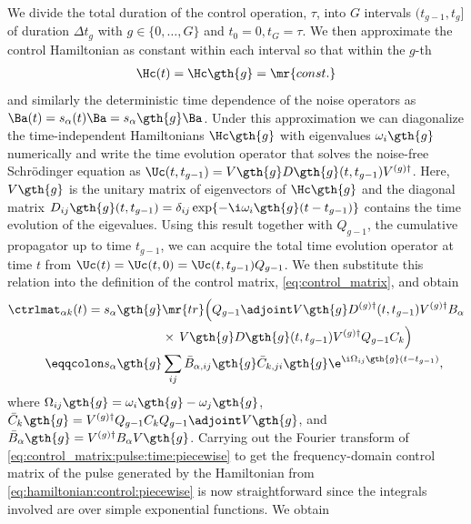 We divide the total duration of the control operation, $\tau$, into $G$ intervals $(t_{g-1}, t_{g}]$ of duration $\Delta t_g$ with $g\in\lbrace 0,\dotsc,G\rbrace$ and $t_0 =  0, t_G = \tau$. We then approximate the control Hamiltonian as constant within each interval so that within the $g$-th
\begin{align}\label{eq:hamiltonian:control:piecewise}
    \Hc(t) = \Hc\gth{g} = \mr{const.}
\end{align}
and similarly the deterministic time dependence of the noise operators as $\Ba(t) = s_\alpha(t)\Ba = s_\alpha\gth{g}\Ba$. Under this approximation we can diagonalize the time-independent Hamiltonians $\Hc\gth{g}$ with eigenvalues $\omega_i\gth{g}$ numerically and write the time evolution operator that solves the noise-free Schr\"odinger equation as $\Uc(t, t_{g-1}) = V\gth{g}D\gth{g}(t, t_{g-1})V^{(g)\dagger}$. Here, $V\gth{g}$ is the unitary matrix of eigenvectors of $\Hc\gth{g}$ and the diagonal matrix $D_{ij}\gth{g}(t, t_{g-1}) = \delta_{ij}\exp\{-\i\omega_i\gth{g}(t - t_{g-1})\}$ contains the time evolution of the eigevalues. Using this result together with $Q_{g-1}$, the cumulative propagator up to time $t_{g-1}$, we can acquire the total time evolution operator at time $t$ from $\Uc(t) = \Uc(t,0) = \Uc(t, t_{g-1}) Q_{g-1}$. We then substitute this relation into the definition of the control matrix, \cref{eq:control_matrix}, and obtain
\begin{align}
    \ctrlmat_{\alpha k}(t) = s_\alpha\gth{g}&\mr{tr}\Bigl(Q_{g-1}\adjoint V\gth{g} D^{(g)\dagger}(t, t_{g-1}) V^{(g)\dagger} B_\alpha \notag\\
                                            &      \times\,V\gth{g} D\gth{g}(t, t_{g-1})V^{(g)\dagger} Q_{g-1} C_k\Bigr) \\
                   \eqqcolon s_\alpha\gth{g}&\sum_{ij}\bar{B}_{\alpha,ij}\gth{g}\bar{C}_{k,ji}\gth{g}
                                   \e^{\i\Omega_{ij}\gth{g}(t - t_{g-1})}, \label{eq:control_matrix:pulse:time:piecewise}
\end{align}
where $\Omega_{ij}\gth{g} = \omega_i\gth{g} - \omega_j\gth{g}$, $\bar{C}_{k}\gth{g} = V^{(g)\dagger}Q_{g-1} C_k Q_{g-1}\adjoint V\gth{g}$, and $\bar{B}_{\alpha}\gth{g} = V^{(g)\dagger} B_\alpha V\gth{g}$. Carrying out the Fourier transform of \cref{eq:control_matrix:pulse:time:piecewise} to get the frequency-domain control matrix of the pulse generated by the Hamiltonian from \cref{eq:hamiltonian:control:piecewise} is now straightforward since the integrals involved are over simple exponential functions. We obtain
